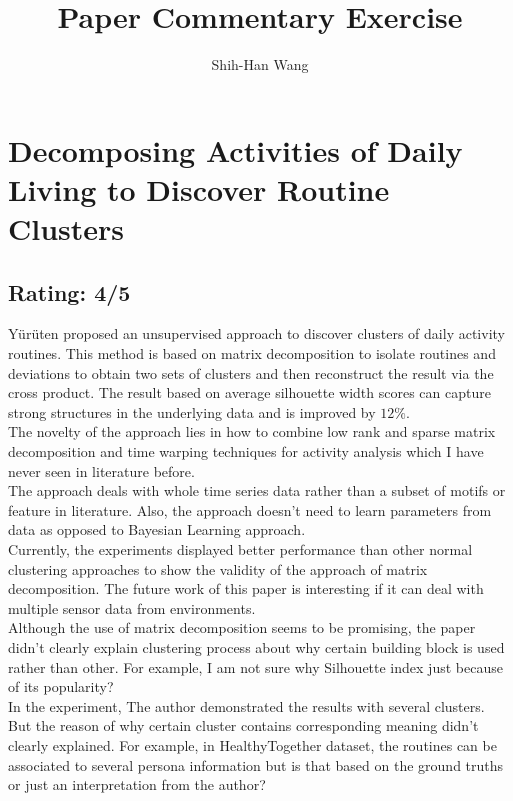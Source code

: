 \documentclass[a4paper]{article}
\title{Paper Commentary Exercise}
\author{Shih-Han Wang}
\begin{document}
\maketitle
\section{Decomposing Activities of Daily Living to Discover Routine Clusters}
\subsection{Rating: 4/5}
Y\"{u}r\"{u}ten \cite{aaai_YurutenZP14} proposed an unsupervised approach to discover clusters of daily activity routines. This method is based on matrix decomposition to isolate routines and deviations to obtain two sets of clusters and then reconstruct the result via the cross product. The result based on average silhouette width scores can capture strong structures in the underlying data and is improved by $12\%$.\\

The novelty of the approach lies in how to combine low rank and sparse matrix decomposition and time warping techniques for activity analysis which I have never seen in literature before. \\

The approach deals with whole time series data rather than a subset of motifs or feature in literature. Also, the approach doesn't need to learn parameters from data as opposed to Bayesian Learning approach.\\

Currently, the experiments displayed better performance than other normal clustering approaches to show the validity of the approach of matrix decomposition. The future work of this paper is interesting if it can deal with multiple sensor data from  environments.\\ 

Although the use of matrix decomposition seems to be promising, the paper didn't clearly explain clustering process about why certain building block is used rather than other. For example, I am not sure why Silhouette index just because of its popularity?\\

In the experiment, The author demonstrated the results with several clusters. But the reason of why certain cluster contains corresponding meaning didn't clearly explained. For example, in HealthyTogether dataset, the routines can be associated to several persona information but is that based on the ground truths or just an interpretation from the author?\\



\end{document}
